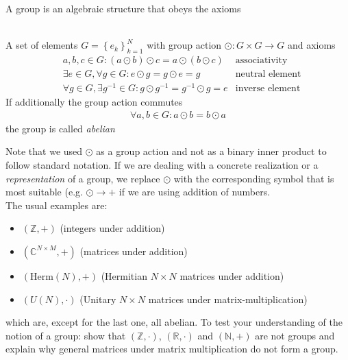 A group is an algebraic structure that obeys the axioms
\begin{def*}\phantom{...}\\
A set of elements $G = \left\{e_k\right\}_{k=1}^N$ with group action $\odot: G\times G
\rightarrow G $ and axioms
\begin{align*}
    &a,b,c\in G: (a\odot b)\odot c = a\odot (b\odot c)& \text{associativity}\\
    &\exists e\in G, \forall g\in G:  e\odot g = g\odot e = g &\text{neutral element}\\
    &\forall g\in G, \exists g^{-1}\in G: g\odot g^{-1}= g^{-1}\odot g = e & \text{inverse element}
\end{align*}
If additionally the group action commutes
\begin{align}
    \forall a,b\in G: a \odot b = b\odot a
\end{align}
the group is called \textit{abelian}
\end{def*}
Note that we used $\odot$ as a group action and not as a binary inner product to follow standard notation. If we are dealing with a concrete realization or a \textit{representation} of a group, we replace $\odot$ with the corresponding symbol that is most suitable (e.g. $\odot \rightarrow +$ if we are using addition of numbers.\\
The usual examples are: 
\begin{itemize}
    \item $(\mathbb{Z},+)$ (integers under addition)
    \item $(\mathbb{C}^{N\times M}, +)$ (matrices under addition)
    \item $(\text{Herm}(N),+)$ (Hermitian $N\times N$ matrices under addition)
    \item $(U(N), \cdot )$ (Unitary $N\times N$ matrices under matrix-multiplication)
\end{itemize}
which are, except for the last one, all abelian.
To test your understanding of the notion of a group: show that $(\mathbb{Z},\cdot)$, $(\mathbb{R}, \cdot)$ and $(\mathbb{N}, +)$ are not groups and explain why general matrices under matrix multiplication do not form a group.\\


